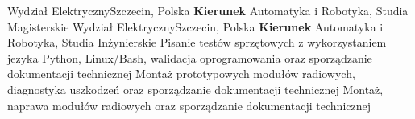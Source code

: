 \documentclass[
    10pt,
    A4,
    polish,
    draft = false,
    twoside = false,
]{article}
\begin{document}
	{Wydział Elektryczny}{Szczecin, Polska}
	{\textbf{Kierunek} Automatyka i Robotyka, Studia Magisterskie}
	{Wydział Elektryczny}{Szczecin, Polska}
	{\textbf{Kierunek} Automatyka i Robotyka, Studia Inżynierskie}
	{Pisanie testów sprzętowych z wykorzystaniem jezyka Python, Linux/Bash, walidacja oprogramowania oraz sporządzanie dokumentacji technicznej}	
	{Montaż prototypowych modułów radiowych, diagnostyka uszkodzeń oraz sporządzanie dokumentacji technicznej} 
	{Montaż, naprawa modułów radiowych oraz sporządzanie dokumentacji technicznej}
\end{document}
